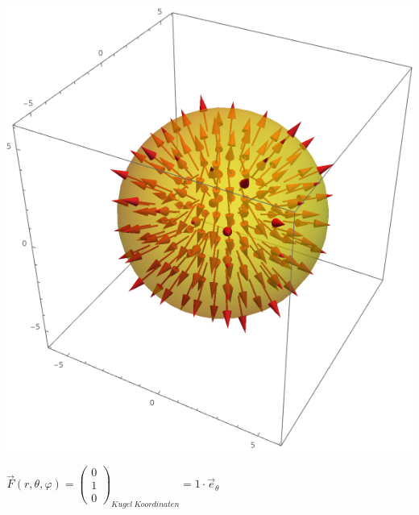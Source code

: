 					\formulaEnd
					\begin{center}

					\includegraphics[scale=0.4]{spherical_r.png}

					\end{center}


					\formulaBegin
						$\vec{F}(r, \theta, \varphi) = \left(\begin{array}{c} 0 \\ 1 \\ 0 \end{array}\right)_{Kugel\ Koordinaten} = 1 \cdot \vec{e}_\theta$ \\


